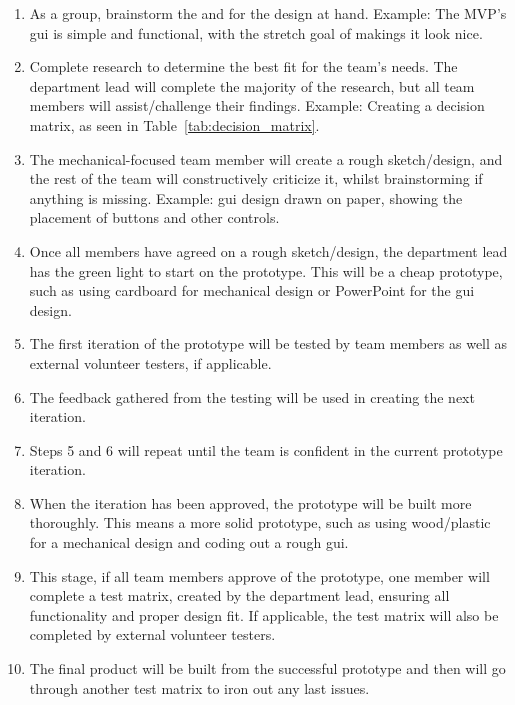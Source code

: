 \begin{enumerate}
    \item As a group, brainstorm the  and  for the design at hand.  
    Example: The MVP's \gls{gui} is simple and functional, with the stretch goal of makings it look nice.  

    \item Complete research to determine the best fit for the team’s needs. The department lead will complete the majority of the research, but all team members will assist/challenge their findings.  
    Example: Creating a decision matrix, as seen in Table~\ref{tab:decision_matrix}.  

    \item The mechanical-focused team member will create a rough sketch/design, and the rest of the team will constructively criticize it, whilst brainstorming if anything is missing.  
    Example: \gls{gui} design drawn on paper, showing the placement of buttons and other controls.  

    \item Once all members have agreed on a rough sketch/design, the department lead has the green light to start on the prototype.  
    This will be a cheap prototype, such as using cardboard for mechanical design or PowerPoint for the \gls{gui} design.  

    \item The first iteration of the prototype will be tested by team members as well as external volunteer testers, if applicable.  

    \item The feedback gathered from the testing will be used in creating the next iteration.  

    \item Steps 5 and 6 will repeat until the team is confident in the current prototype iteration.  

    \item When the iteration has been approved, the prototype will be built more thoroughly.  
    This means a more solid prototype, such as using wood/plastic for a mechanical design and coding out a rough \gls{gui}.  

    \item This stage, if all team members approve of the prototype, one member will complete a test matrix, created by the department lead, ensuring all functionality and proper design fit. If applicable, the test matrix will also be completed by external volunteer testers.  

    \item The final product will be built from the successful prototype and then will go through another test matrix to iron out any last issues.
\end{enumerate}
